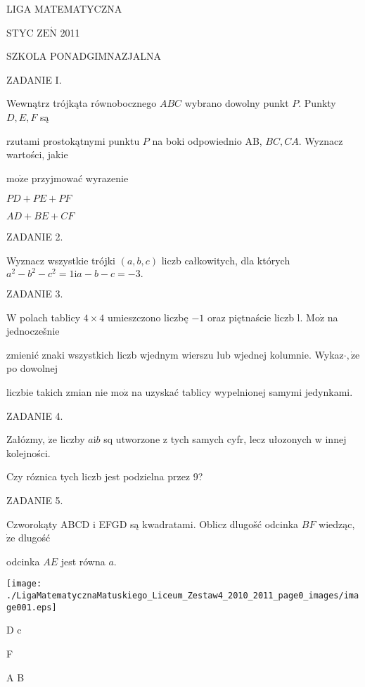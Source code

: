 \documentclass[a4paper,12pt]{article}
\begin{document}
LIGA MATEMATYCZNA

STYC Z$\mathrm{E}\acute{\mathrm{N}}$ 2011

SZKOLA PONADGIMNAZJALNA

ZADANIE I.

Wewnątrz trójkąta równobocznego $ABC$ wybrano dowolny punkt $P$. Punkty $D, E, F$ są

rzutami prostokątnymi punktu $P$ na boki odpowiednio AB, $BC, CA$. Wyznacz wartości, jakie

$\mathrm{m}\mathrm{o}\dot{\mathrm{z}}\mathrm{e}$ przyjmować wyrazenie

$PD+PE+PF$

$AD+BE+CF$

ZADANIE 2.

Wyznacz wszystkie trójki $(a,b,c)$ liczb całkowitych, dla których $a^{2}-b^{2}-c^{2}=1\mathrm{i}a-b-c=-3.$

ZADANIE 3.

$\mathrm{W}$ polach tablicy $4\times 4$ umieszczono liczbę $-1$ oraz piętnaście liczb l. $\mathrm{M}\mathrm{o}\dot{\mathrm{z}}$ na jednoczešnie

zmienić znaki wszystkich liczb wjednym wierszu lub wjednej kolumnie. Wykaz$\cdot, \dot{\mathrm{z}}\mathrm{e}$ po dowolnej

liczbie takich zmian nie $\mathrm{m}\mathrm{o}\dot{\mathrm{z}}$ na uzyskać tablicy wypelnionej samymi jedynkami.

ZADANIE 4.

Załózmy, $\dot{\mathrm{z}}\mathrm{e}$ liczby $a\mathrm{i}b$ sq utworzone z tych samych cyfr, lecz ułozonych w innej kolejności.

Czy róznica tych liczb jest podzielna przez 9?

ZADANIE 5.

Czworokąty ABCD $\mathrm{i}$ EFGD są kwadratami. Oblicz dlugošć odcinka $BF$ wiedząc, $\dot{\mathrm{z}}\mathrm{e}$ dlugość

odcinka $AE$ jest równa $a.$
\begin{center}
\texttt{[image: ./LigaMatematycznaMatuskiego\_Liceum\_Zestaw4\_2010\_2011\_page0\_images/image001.eps]}
\end{center}
D c

F

A  B
\end{document}
